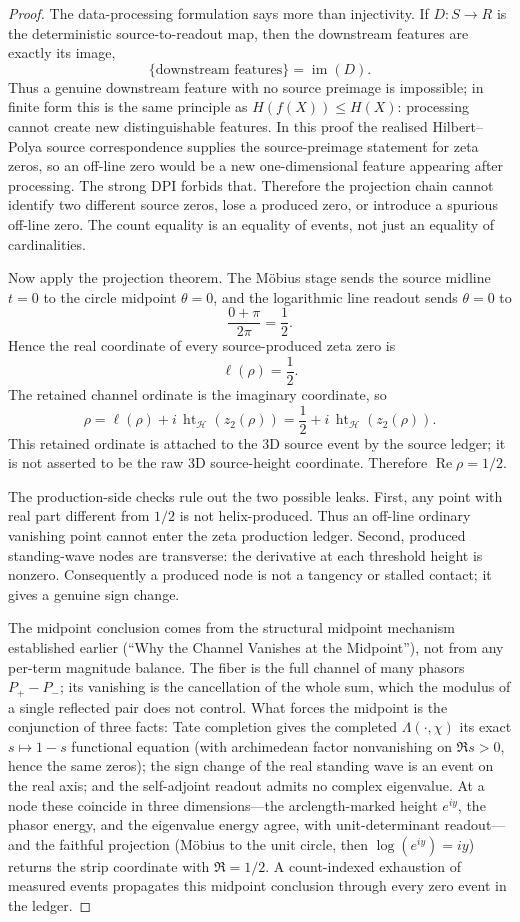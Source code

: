 \documentclass[11pt]{article}
\DeclareMathOperator{\Ree}{Re}
\DeclareMathOperator{\hgt}{ht}
\begin{document}
\begin{proof}
The data-processing formulation says more than injectivity.  If
\(D:S\to R\) is the deterministic source-to-readout map, then the downstream
features are exactly its image,
\[
  \{\text{downstream features}\}=\operatorname{im}(D).
\]
Thus a genuine downstream feature with no source preimage is impossible; in
finite form this is the same principle as \(H(f(X))\le H(X)\): processing
cannot create new distinguishable features.  In
this proof the realised Hilbert--Polya source correspondence supplies the
source-preimage statement for zeta zeros, so an off-line zero would be a new
one-dimensional feature appearing after processing.  The strong DPI forbids
that.  Therefore the projection chain cannot identify two different source
zeros, lose a produced zero, or introduce a spurious off-line zero.  The count
equality is an equality of events, not just an equality of cardinalities.

Now apply the projection theorem.  The Möbius stage sends the source midline
$t=0$ to the circle midpoint $\theta=0$, and the logarithmic line readout sends
$\theta=0$ to
\[
  \frac{0+\pi}{2\pi}=\frac12 .
\]
Hence the real coordinate of every source-produced zeta zero is
\[
  \ell(\rho)=\frac12 .
\]
The retained channel ordinate is the imaginary coordinate, so
\[
  \rho=\ell(\rho)+i\,\hgt_{\mathcal H}(z_2(\rho))
       =\frac12+i\,\hgt_{\mathcal H}(z_2(\rho)).
\]
This retained ordinate is attached to the 3D source event by the source ledger;
it is not asserted to be the raw 3D source-height coordinate.
Therefore $\Ree\rho=1/2$.

The production-side checks rule out the two possible leaks.  First, any point
with real part different from $1/2$ is not helix-produced.  Thus an off-line
ordinary vanishing point cannot enter the zeta production ledger.  Second,
produced standing-wave nodes are transverse: the derivative at each threshold
height is nonzero.  Consequently a produced node is not a tangency or stalled
contact; it gives a genuine sign change.

The midpoint conclusion comes from the structural midpoint mechanism established
earlier (``Why the Channel Vanishes at the Midpoint''), not from any per-term
magnitude balance.  The
fiber is the full channel of many phasors $P_+-P_-$; its vanishing is the
cancellation of the whole sum, which the modulus of a single reflected pair does
not control.  What forces the midpoint is the conjunction of three facts: Tate
completion gives the completed $\Lambda(\cdot,\chi)$ its exact $s\mapsto1-s$
functional equation (with archimedean factor nonvanishing on $\Re s>0$, hence
the same zeros); the sign change of the real standing wave is an event on the
real axis; and the self-adjoint readout admits no complex eigenvalue.  At a node
these coincide in three dimensions---the arclength-marked height $e^{iy}$, the
phasor energy, and the eigenvalue energy agree, with unit-determinant
readout---and the faithful projection (Möbius to the unit circle, then
$\log(e^{iy})=iy$) returns the strip coordinate with $\Re=1/2$.  A count-indexed
exhaustion of measured events propagates this midpoint conclusion through every
zero event in the ledger.


\end{proof}
\end{document}
